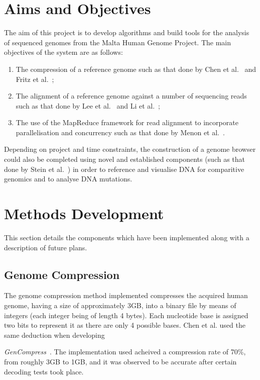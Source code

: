 \documentclass{csfyp}
\begin{document}
\begin{small}
\section{Aims and Objectives}\vspace{-3ex}

The aim of this project is to develop algorithms and build tools for the analysis of sequenced genomes from the Malta Human Genome Project.  The main objectives of the system are as follows:

\begin{enumerate}[nolistsep]

   \item The compression of a reference genome such as that done by Chen et al.~\cite{gencompress} and Fritz et al.~\cite{refcompression};

  \item The alignment of a reference genome against a number of sequencing reads such as that done by Lee et al.~\cite{cgreads} and Li et al.~\cite{bwtransform};

  \item The use of the MapReduce framework for read alignment to incorporate parallelisation and concurrency such as that done by Menon et al.~\cite{mapredgen}.

\end{enumerate}

Depending on project and time constraints, the construction of a genome browser could also be completed using novel and established components (such as that done by Stein et al.~\cite{genericbrowser}) in order to reference and visualise DNA for comparitive genomics and to analyse DNA mutations.


\section{Methods Development}\vspace{-3ex}

This section details the components which have been implemented along with a description of future plans.

\subsection{Genome Compression}\vspace{-4ex}
The genome compression method implemented compresses the acquired human genome, having a size of approximately 3GB, into a binary file by means of integers (each integer being of length 4 bytes).  Each nucleotide base is assigned two bits to represent it as there are only 4 possible bases. Chen et al. used the same deduction when developing {\textit{GenCompress}~\cite{gencompress}.  The implementation used acheived a compression rate of 70\%, from roughly 3GB to 1GB,  and it was observed to be accurate after certain decoding tests took place.        

}
\end{small}
\end{document}
